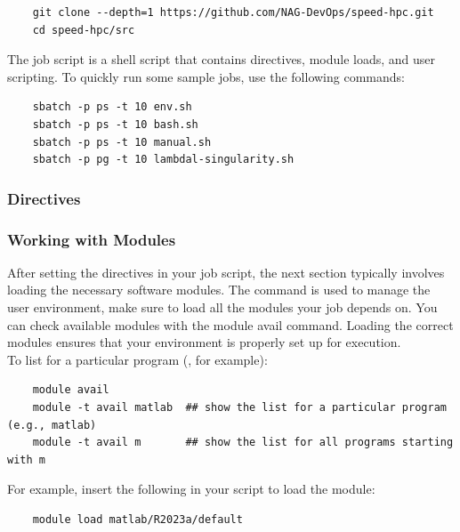 \documentclass{easychair}
\begin{document}
\begin{verbatim}
    git clone --depth=1 https://github.com/NAG-DevOps/speed-hpc.git
    cd speed-hpc/src
\end{verbatim}

\noindent The job script is a shell script that contains directives, module loads, and user scripting.
To quickly run some sample jobs, use the following commands:
\begin{verbatim}
    sbatch -p ps -t 10 env.sh
    sbatch -p ps -t 10 bash.sh
    sbatch -p ps -t 10 manual.sh
    sbatch -p pg -t 10 lambdal-singularity.sh
\end{verbatim}

\subsubsection{Directives}
\label{sect:directives}


\subsubsection{Working with Modules}
\label{sect:modules}

After setting the directives in your job script, the next section typically involves loading 
the necessary software modules. The  command is used to manage the user environment, 
make sure to load all the modules your job depends on. You can check available modules with the 
module avail command. Loading the correct modules ensures that your environment is properly 
set up for execution.\\

\noindent To list for a particular program (, for example):
%
\small
\begin{verbatim}
    module avail
    module -t avail matlab  ## show the list for a particular program (e.g., matlab)
    module -t avail m       ## show the list for all programs starting with m     
\end{verbatim}
\normalsize

\noindent For example, insert the following in your script to load the  module:
\begin{verbatim}
    module load matlab/R2023a/default
\end{verbatim}
\end{document}

